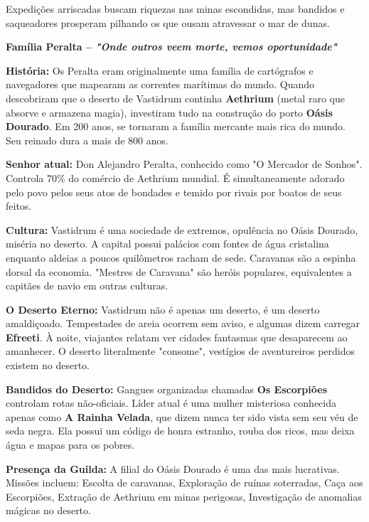 Expedições arriscadas buscam riquezas nas minas escondidas, mas bandidos e saqueadores prosperam pilhando os que ousam atravessar o mar de dunas.

\textbf{\ringmfamily Família Peralta – \textit{"Onde outros veem morte, vemos oportunidade"}}

\textbf{\ringmfamily História:} Os Peralta eram originalmente uma família de cartógrafos e navegadores que mapearam as correntes marítimas do mundo. Quando descobriram que o deserto de Vastidrum continha \textbf{Aethrium} (metal raro que absorve e armazena magia), investiram tudo na construção do porto \textbf{Oásis Dourado}. Em 200 anos, se tornaram a família mercante mais rica do mundo. Seu reinado dura a mais de 800 anos.

\textbf{\ringmfamily Senhor atual:} Don Alejandro Peralta, conhecido como "O Mercador de Sonhos". Controla 70\% do comércio de Aethrium mundial. É simultaneamente adorado pelo povo pelos seus atos de bondades e temido por rivais por boatos de seus feitos.

\textbf{\ringmfamily Cultura:} Vastidrum é uma sociedade de extremos, opulência no Oásis Dourado, miséria no deserto. A capital possui palácios com fontes de água cristalina enquanto aldeias a poucos quilômetros racham de sede. Caravanas são a espinha dorsal da economia. "Mestres de Caravana" são heróis populares, equivalentes a capitães de navio em outras culturas.

\textbf{\ringmfamily O Deserto Eterno:} Vastidrum não é apenas um deserto, é um deserto amaldiçoado. Tempestades de areia ocorrem sem aviso, e algumas dizem carregar \textbf{Efreeti}. À noite, viajantes relatam ver cidades fantasmas que desaparecem ao amanhecer. O deserto literalmente "consome", vestígios de aventureiros perdidos existem no deserto.

\textbf{\ringmfamily Bandidos do Deserto:} Gangues organizadas chamadas \textbf{Os Escorpiões} controlam rotas não-oficiais. Líder atual é uma mulher misteriosa conhecida apenas como \textbf{A Rainha Velada}, que dizem nunca ter sido vista sem seu véu de seda negra. Ela possui um código de honra estranho, rouba dos ricos, mas deixa água e mapas para os pobres.

\textbf{\ringmfamily Presença da Guilda:} A filial do Oásis Dourado é uma das mais lucrativas. Missões incluem: Escolta de caravanas, Exploração de ruínas soterradas, Caça aos Escorpiões, Extração de Aethrium em minas perigosas, Investigação de anomalias mágicas no deserto.

